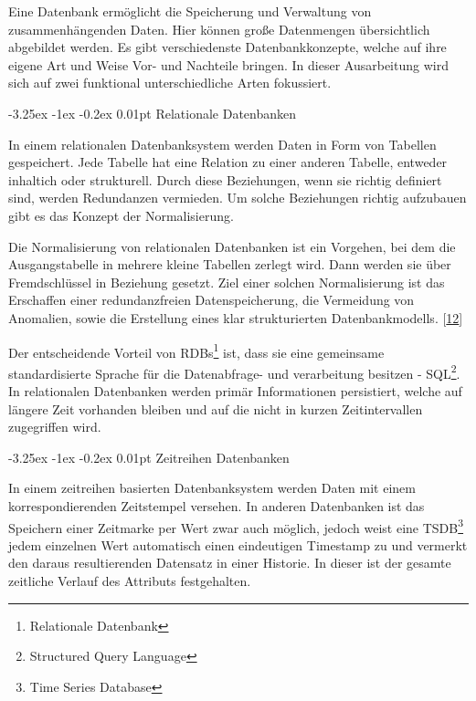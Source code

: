 \documentclass[
    headings=optiontotocandhead,%
    twoside,
    numbers=noenddot,%
    12pt, %
    titlepage, %
    parskip=full, %
    listof=leveldown, 
    numbers=noenddot, %
    a4paper,DIV=14,
    BCOR=15mm,
]{scrbook}
\makeatletter
\renewenvironment{quote}{\begin{customblockquote}\list{}{\rightmargin=0em\leftmargin=0em}%
\item\relax\color{blockquote-text}\ignorespaces}{\unskip\unskip\endlist\end{customblockquote}}
\renewcommand\paragraph{\@startsection{paragraph}{4}{\z@}%
    {-3.25ex \@plus -1ex \@minus -0.2ex}%
    {0.01pt}%
    {\raggedsection\normalfont\sectfont\nobreak\size@paragraph}%
  }
\makeatother
\begin{document}
Eine Datenbank ermöglicht die Speicherung und Verwaltung von
zusammenhängenden Daten. Hier können große Datenmengen übersichtlich
abgebildet werden. Es gibt verschiedenste Datenbankkonzepte, welche auf
ihre eigene Art und Weise Vor- und Nachteile bringen. In dieser
Ausarbeitung wird sich auf zwei funktional unterschiedliche Arten
fokussiert.

\hypertarget{relationale-datenbanken}{%
\paragraph{Relationale Datenbanken}\label{relationale-datenbanken}}

In einem relationalen Datenbanksystem werden Daten in Form von Tabellen
gespeichert. Jede Tabelle hat eine Relation zu einer anderen Tabelle,
entweder inhaltich oder strukturell. Durch diese Beziehungen, wenn sie
richtig definiert sind, werden Redundanzen vermieden. Um solche
Beziehungen richtig aufzubauen gibt es das Konzept der Normalisierung.

\begin{quote}
Die Normalisierung von relationalen Datenbanken ist ein Vorgehen, bei
dem die Ausgangstabelle in mehrere kleine Tabellen zerlegt wird. Dann
werden sie über Fremdschlüssel in Beziehung gesetzt. Ziel einer solchen
Normalisierung ist das Erschaffen einer redundanzfreien
Datenspeicherung, die Vermeidung von Anomalien, sowie die Erstellung
eines klar strukturierten Datenbankmodells.
{[}\protect\hyperlink{ref-Nachhilfe-Team}{12}{]}
\end{quote}

Der entscheidende Vorteil von RDBs\footnote{Relationale Datenbank} ist,
dass sie eine gemeinsame standardisierte Sprache für die Datenabfrage-
und verarbeitung besitzen - SQL\footnote{Structured Query Language}. In
relationalen Datenbanken werden primär Informationen persistiert, welche
auf längere Zeit vorhanden bleiben und auf die nicht in kurzen
Zeitintervallen zugegriffen wird.

\hypertarget{zeitreihen-datenbanken}{%
\paragraph{Zeitreihen Datenbanken}\label{zeitreihen-datenbanken}}

In einem zeitreihen basierten Datenbanksystem werden Daten mit einem
korrespondierenden Zeitstempel versehen. In anderen Datenbanken ist das
Speichern einer Zeitmarke per Wert zwar auch möglich, jedoch weist eine
TSDB\footnote{Time Series Database} jedem einzelnen Wert automatisch
einen eindeutigen Timestamp zu und vermerkt den daraus resultierenden
Datensatz in einer Historie. In dieser ist der gesamte zeitliche Verlauf
des Attributs festgehalten.
\end{document}
